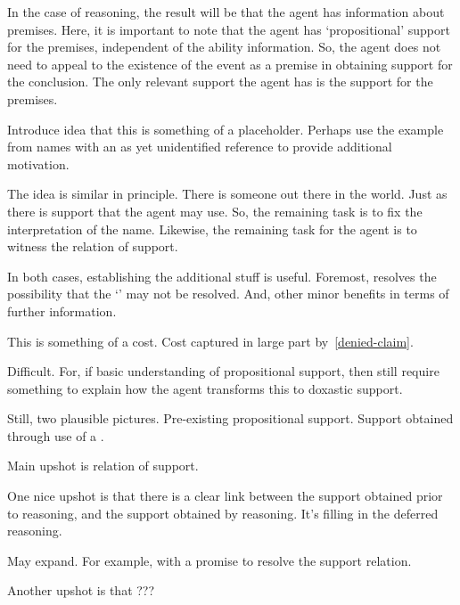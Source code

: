 \begin{note}
  In the case of reasoning, the result will be that the agent has information about premises.
  Here, it is important to note that the agent has `propositional' support for the premises, independent of the ability information.
  So, the agent does not need to appeal to the existence of the event as a premise in obtaining support for the conclusion.
  The only relevant support the agent has is the support for the premises.
\end{note}

\begin{note}
  Introduce idea that this is something of a placeholder.
  Perhaps use the example from names with an as yet unidentified reference to provide additional motivation.

  The idea is similar in principle.
  There is someone out there in the world.
  Just as there is support that the agent may use.
  So, the remaining task is to fix the interpretation of the name.
  Likewise, the remaining task for the agent is to witness the relation of support.

  In both cases, establishing the additional stuff is useful.
  Foremost, resolves the possibility that the `\future{}' may not be resolved.
  And, other minor benefits in terms of further information.
\end{note}

\begin{note}
  This is something of a cost.
  Cost captured in large part by~\ref{denied-claim}.

  Difficult.
  For, if basic understanding of propositional support, then still require something to explain how the agent transforms this to doxastic support.

  Still, two plausible pictures.
  Pre-existing propositional support.
  Support obtained through use of a \future{}.
\end{note}

\begin{note}[Upshot]
  Main upshot is relation of support.

  One nice upshot is that there is a clear link between the support obtained prior to reasoning, and the support obtained by reasoning.
  It's filling in the deferred reasoning.

  May expand.
  For example, with a promise to resolve the support relation.

  Another upshot is that ???
\end{note}


